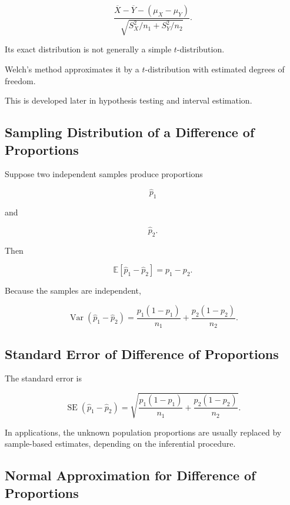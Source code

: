 \[
\boxed{
\frac{
\overline{X}-\overline{Y}
-
(\mu_X-\mu_Y)
}{
\sqrt{
S_X^2/n_1
+
S_Y^2/n_2
}
}.
}
\]

Its exact distribution is not generally a simple \(t\)-distribution.

Welch's method approximates it by a \(t\)-distribution with estimated
degrees of freedom.

This is developed later in hypothesis testing and interval estimation.

\subsection{Sampling Distribution of a Difference of Proportions}
\label{subsec:difference-proportions-sampling}

Suppose two independent samples produce proportions

\[
\widehat{p}_1
\]

and

\[
\widehat{p}_2.
\]

Then

\[
\boxed{
\mathbb{E}
[
\widehat{p}_1-\widehat{p}_2
]
=
p_1-p_2.
}
\]

Because the samples are independent,

\[
\boxed{
\operatorname{Var}
(
\widehat{p}_1-\widehat{p}_2
)
=
\frac{
p_1(1-p_1)
}{
n_1
}
+
\frac{
p_2(1-p_2)
}{
n_2
}.
}
\]

\subsection{Standard Error of Difference of Proportions}
\label{subsec:se-difference-proportions}

The standard error is

\[
\boxed{
\operatorname{SE}
(
\widehat{p}_1-\widehat{p}_2
)
=
\sqrt{
\frac{
p_1(1-p_1)
}{
n_1
}
+
\frac{
p_2(1-p_2)
}{
n_2
}
}.
}
\]

In applications, the unknown population proportions are usually replaced
by sample-based estimates, depending on the inferential procedure.

\subsection{Normal Approximation for Difference of Proportions}
\label{subsec:normal-difference-proportions}

